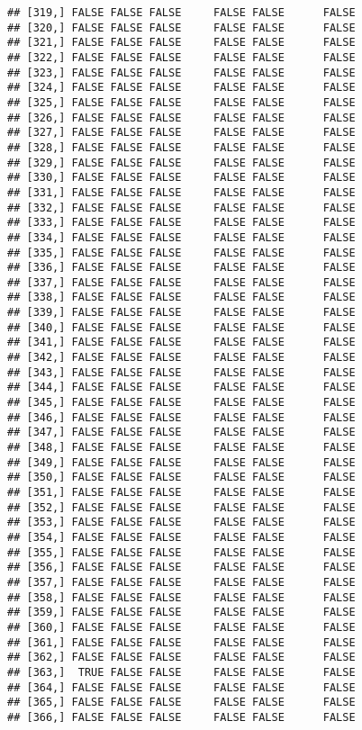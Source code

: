 \documentclass[
]{article}
\begin{document}
\begin{verbatim}
## [319,] FALSE FALSE FALSE     FALSE FALSE      FALSE
## [320,] FALSE FALSE FALSE     FALSE FALSE      FALSE
## [321,] FALSE FALSE FALSE     FALSE FALSE      FALSE
## [322,] FALSE FALSE FALSE     FALSE FALSE      FALSE
## [323,] FALSE FALSE FALSE     FALSE FALSE      FALSE
## [324,] FALSE FALSE FALSE     FALSE FALSE      FALSE
## [325,] FALSE FALSE FALSE     FALSE FALSE      FALSE
## [326,] FALSE FALSE FALSE     FALSE FALSE      FALSE
## [327,] FALSE FALSE FALSE     FALSE FALSE      FALSE
## [328,] FALSE FALSE FALSE     FALSE FALSE      FALSE
## [329,] FALSE FALSE FALSE     FALSE FALSE      FALSE
## [330,] FALSE FALSE FALSE     FALSE FALSE      FALSE
## [331,] FALSE FALSE FALSE     FALSE FALSE      FALSE
## [332,] FALSE FALSE FALSE     FALSE FALSE      FALSE
## [333,] FALSE FALSE FALSE     FALSE FALSE      FALSE
## [334,] FALSE FALSE FALSE     FALSE FALSE      FALSE
## [335,] FALSE FALSE FALSE     FALSE FALSE      FALSE
## [336,] FALSE FALSE FALSE     FALSE FALSE      FALSE
## [337,] FALSE FALSE FALSE     FALSE FALSE      FALSE
## [338,] FALSE FALSE FALSE     FALSE FALSE      FALSE
## [339,] FALSE FALSE FALSE     FALSE FALSE      FALSE
## [340,] FALSE FALSE FALSE     FALSE FALSE      FALSE
## [341,] FALSE FALSE FALSE     FALSE FALSE      FALSE
## [342,] FALSE FALSE FALSE     FALSE FALSE      FALSE
## [343,] FALSE FALSE FALSE     FALSE FALSE      FALSE
## [344,] FALSE FALSE FALSE     FALSE FALSE      FALSE
## [345,] FALSE FALSE FALSE     FALSE FALSE      FALSE
## [346,] FALSE FALSE FALSE     FALSE FALSE      FALSE
## [347,] FALSE FALSE FALSE     FALSE FALSE      FALSE
## [348,] FALSE FALSE FALSE     FALSE FALSE      FALSE
## [349,] FALSE FALSE FALSE     FALSE FALSE      FALSE
## [350,] FALSE FALSE FALSE     FALSE FALSE      FALSE
## [351,] FALSE FALSE FALSE     FALSE FALSE      FALSE
## [352,] FALSE FALSE FALSE     FALSE FALSE      FALSE
## [353,] FALSE FALSE FALSE     FALSE FALSE      FALSE
## [354,] FALSE FALSE FALSE     FALSE FALSE      FALSE
## [355,] FALSE FALSE FALSE     FALSE FALSE      FALSE
## [356,] FALSE FALSE FALSE     FALSE FALSE      FALSE
## [357,] FALSE FALSE FALSE     FALSE FALSE      FALSE
## [358,] FALSE FALSE FALSE     FALSE FALSE      FALSE
## [359,] FALSE FALSE FALSE     FALSE FALSE      FALSE
## [360,] FALSE FALSE FALSE     FALSE FALSE      FALSE
## [361,] FALSE FALSE FALSE     FALSE FALSE      FALSE
## [362,] FALSE FALSE FALSE     FALSE FALSE      FALSE
## [363,]  TRUE FALSE FALSE     FALSE FALSE      FALSE
## [364,] FALSE FALSE FALSE     FALSE FALSE      FALSE
## [365,] FALSE FALSE FALSE     FALSE FALSE      FALSE
## [366,] FALSE FALSE FALSE     FALSE FALSE      FALSE

\end{verbatim}
\end{document}
